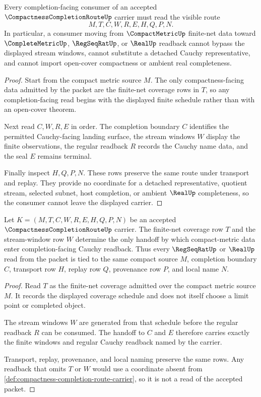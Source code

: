\begin{theorem}
\label{thm:compactness-completion-route-nonescape}
Every completion-facing consumer of an accepted $\CompactnessCompletionRouteUp$ carrier must read the visible route
$$
M,T,C,W,R,E,H,Q,P,N .
$$
In particular, a consumer moving from $\CompactMetricUp$ finite-net data toward $\CompleteMetricUp$, $\RegSeqRatUp$, or $\RealUp$ readback cannot bypass the displayed stream windows, cannot substitute a detached Cauchy representative, and cannot import open-cover compactness or ambient real completeness.
\end{theorem}
\begin{proof}
Start from the compact metric source $M$. The only compactness-facing data admitted by the packet are the finite-net coverage rows in $T$, so any completion-facing read begins with the displayed finite schedule rather than with an open-cover theorem.

Next read $C,W,R,E$ in order. The completion boundary $C$ identifies the permitted Cauchy-facing landing surface, the stream windows $W$ display the finite observations, the regular readback $R$ records the Cauchy name data, and the seal $E$ remains terminal.

Finally inspect $H,Q,P,N$. These rows preserve the same route under transport and replay. They provide no coordinate for a detached representative, quotient stream, selected subnet, host completion, or ambient $\RealUp$ completeness, so the consumer cannot leave the displayed carrier.
\end{proof}

\begin{theorem}
\label{thm:compactness-completion-route-finite-net-handoff}
Let $K=(M,T,C,W,R,E,H,Q,P,N)$ be an accepted $\CompactnessCompletionRouteUp$ carrier. The finite-net coverage row $T$ and the stream-window row $W$ determine the only handoff by which compact-metric data enter completion-facing Cauchy readback. Thus every $\RegSeqRatUp$ or $\RealUp$ read from the packet is tied to the same compact source $M$, completion boundary $C$, transport row $H$, replay row $Q$, provenance row $P$, and local name $N$.
\end{theorem}
\begin{proof}
Read $T$ as the finite-net coverage admitted over the compact metric source $M$. It records the displayed coverage schedule and does not itself choose a limit point or completed object.

The stream windows $W$ are generated from that schedule before the regular readback $R$ can be consumed. The handoff to $C$ and $E$ therefore carries exactly the finite windows and regular Cauchy readback named by the carrier.

Transport, replay, provenance, and local naming preserve the same rows. Any readback that omits $T$ or $W$ would use a coordinate absent from \autoref{def:compactness-completion-route-carrier}, so it is not a read of the accepted packet.
\end{proof}

